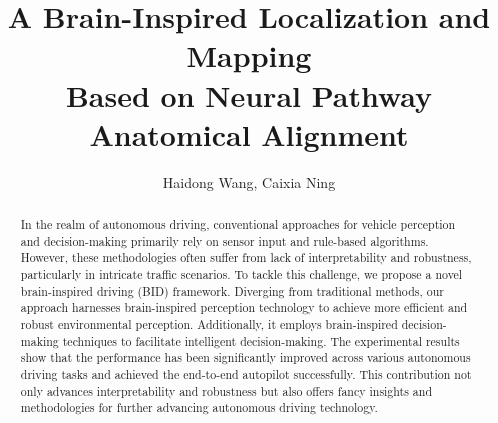 \documentclass[preprint,12pt]{elsarticle}
\begin{document}
\begin{frontmatter}



\title{A Brain-Inspired Localization and Mapping \\Based on Neural Pathway Anatomical Alignment} %


\author{Haidong Wang, Caixia Ning} %


\begin{abstract}
In the realm of autonomous driving, conventional approaches for vehicle perception and decision-making primarily rely on sensor input and rule-based algorithms. 
However, these methodologies often suffer from lack of interpretability and robustness, particularly in intricate traffic scenarios. 
To tackle this challenge, we propose a novel brain-inspired driving (BID) framework. 
Diverging from traditional methods, our approach harnesses brain-inspired perception technology to achieve more efficient and robust environmental perception. 
Additionally, it employs brain-inspired decision-making techniques to facilitate intelligent decision-making. 
The experimental results show that the performance has been significantly improved across various autonomous driving tasks and achieved the end-to-end autopilot successfully. 
This contribution not only advances interpretability and robustness but also offers fancy insights and methodologies for further advancing autonomous driving technology.
\end{abstract}


\end{frontmatter}
\end{document}
